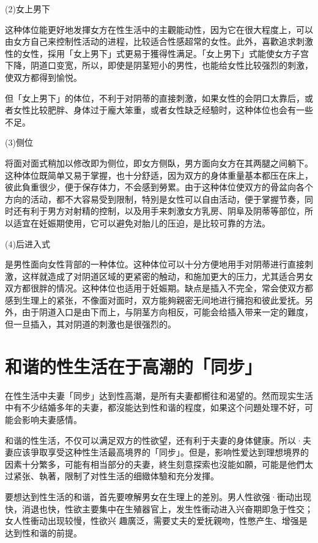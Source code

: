 \documentclass[12pt,UTF8]{ctexbook}
\begin{document}
(2)女上男下

这种体位能更好地发揮女方在性生活中的主觀能动性，因为它在很大程度上，可以由女方自己来控制性活动的进程，比较适合性感超常的女性。此外，喜歡追求刺激性的女性，採用「女上男下」式更易于獲得性满足。「女上男下」式能使女方子宫下降，阴道口变宽，所以，即使是阴茎短小的男性，也能给女性比较强烈的刺激，使双方都得到愉悦。

但「女上男下」的体位，不利于对阴蒂的直接刺激，如果女性的会阴口太靠后，或者女性比较肥胖、身体过于龐大笨重，或者女性缺乏经驗时，这种体位也会有一些不足。

(3)侧位

将面对面式稍加以修改即为侧位，即女方侧臥，男方面向女方在其两腿之间躺下。这种体位既简单又易于掌握，也十分舒适，因为双方的身体重量基本都压在床上，彼此負重很少，便于保存体力，不会感到勞累。由于这种体位使双方的骨盆向各个方向的活动，都不大容易受到限制，特別是女性可以自由活动，便于掌握节奏，同时还有利于男方对射精的控制，以及用手来刺激女方乳房、阴阜及阴蒂等部位，所以适宜在妊娠期使用，它可以避免对胎儿的压迫，是比较可靠的方法。

(4)后进入式

是男性面向女性背部的一种体位。这种体位可以十分方便地用手对阴蒂进行直接刺激，这样就造成了对阴道区域的更紧密的触动，和施加更大的压力，尤其适合男女双方都很胖的情况。这种体位也适用于妊娠期。缺点是插入不完全，常会使双方都感到生理上的紧张，不像面对面时，双方能夠親密无间地进行擁抱和彼此爱抚。另外，由于阴道入口是由下而上，与阴茎方向相反，可能会给插入带来一定的難度，但一旦插入，其对阴道的刺激也是很强烈的。

\section{和谐的性生活在于高潮的「同步」}

在性生活中夫妻「同步」达到性高潮，是所有夫妻都嚮往和渴望的。然而现实生活中有不少结婚多年的夫妻，都沒能达到性和谐的程度，如果这个问題处理不好，可能会影响夫妻感情。

和谐的性生活，不仅可以满足双方的性欲望，还有利于夫妻的身体健康。所以·夫妻应该爭取享受这种性生活最高境界的「同步」。但是，影响性爱达到理想境界的因素十分繁多，可能有相当部分的夫妻，終生刻意探索也沒能如願，可能是他們太过紧张、執著，限制了对性生活的细緻体驗和充分发揮。

要想达到性生活的和谐，首先要嘹解男女在生理上的差別。男人性欲强·衝动出现快，消退也快，性欲主要集中在生殖器官上，发生性衝动进入兴奋期即急于性交；女人性衝动出现较慢，性欲兴
趣廣泛，需要丈夫的爱抚親吻，性憋产生、增强是达到性和谐的前提。
\end{document}
